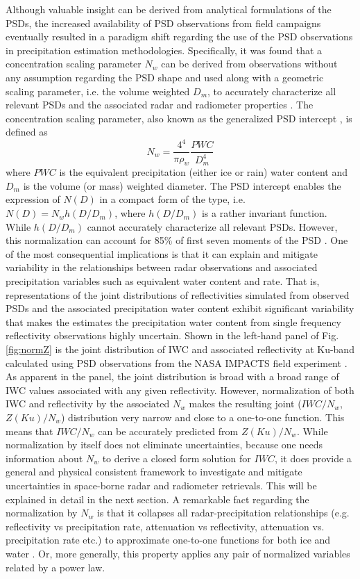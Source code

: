 \documentclass[10pt]{ietbook}
\begin{document}
Although valuable insight can be derived from analytical formulations of the PSDs, the increased availability of PSD observations from field
campaigns eventually resulted in a paradigm shift regarding the use of the PSD observations in precipitation estimation methodologies.  Specifically,
it was found that a concentration scaling parameter $N_w$ can be derived from observations without any assumption regarding the PSD shape 
and used along with a geometric scaling parameter, i.e.
the volume weighted $D_m$, to accurately characterize all relevant PSDs and the associated radar and radiometer properties \cite{norm_dsd_2001}.  
The concentration scaling
parameter, also known as the generalized PSD intercept \cite{bringi2003}, is defined as
\begin{equation} \label{eq:nw}
    N_w=\frac {4^4} {\pi \rho_w} \frac {PWC} {D_m^4}
\end{equation}
where $PWC$ is the equivalent precipitation (either ice or rain) water content and $D_m$ is the volume (or mass) weighted diameter. 
The PSD intercept enables the expression of $N(D)$ in a compact form of the type, i.e. $N(D)=N_w h(D/D_m)$, where $h(D/D_m)$ is a rather 
invariant function. While $h(D/D_m)$ cannot accurately characterize all relevant  PSDs. 
However, this normalization can account for 85\% of first seven moments of the PSD \cite{berne2017}.
One of the most consequential implications is that it can explain and mitigate variability in the relationships between
radar observations and associated precipitation variables such as equivalent water content and rate.  
That is, representations of the joint distributions of reflectivities simulated from 
observed PSDs and the associated precipitation water content exhibit significant variability that makes the estimates the precipitation water content
from single frequency reflectivity observations highly uncertain.  Shown in the left-hand panel of Fig. \ref{fig:normZ} is the joint distribution of 
IWC and associated reflectivity at Ku-band calculated using PSD observations from the NASA IMPACTS field experiment \cite{impacts2022}.  As apparent 
in the panel, the joint distribution is broad with a broad range of IWC values associated with any given reflectivity.  However, normalization of 
both IWC and reflectivity by the associated $N_w$ makes the resulting joint ($IWC/N_w$, $Z(Ku)/N_w$) distribution very narrow and close to a one-to-one function.
This means that $IWC/N_w$ can be accurately predicted from $Z(Ku)/N_w$.  While normalization by itself does not eliminate uncertainties, because one
needs information about $N_w$ to derive a closed form solution for $IWC$, it does provide a general and physical consistent 
framework to investigate and mitigate uncertainties in space-borne radar and radiometer retrievals.  This will be explained in detail in the next 
section.  A remarkable fact regarding the normalization by $N_w$ is that it collapses all radar-precipitation relationships (e.g. reflectivity vs precipitation
rate, attenuation vs reflectivity, attenuation vs. precipitation rate etc.) to approximate one-to-one functions for both ice 
and water \cite{ferreira2001}. Or, more generally, this property applies any pair of normalized variables related by a power law.
\end{document}
